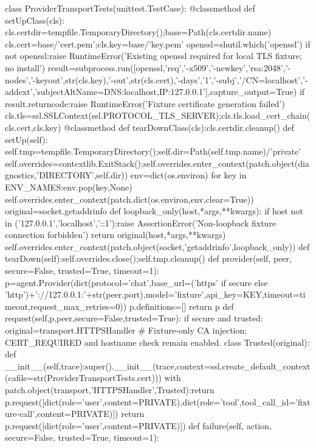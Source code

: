{{class ProviderTransportTests(unittest.TestCase):
    @classmethod
    def setUpClass(cls):
        cls.certdir=tempfile.TemporaryDirectory();base=Path(cls.certdir.name)
        cls.cert=base/'cert.pem';cls.key=base/'key.pem'
        openssl=shutil.which('openssl')
        if not openssl:raise RuntimeError('Existing openssl required for local TLS fixture; no install')
        result=subprocess.run([openssl,'req','-x509','-newkey','rsa:2048','-nodes','-keyout',str(cls.key),'-out',str(cls.cert),'-days','1','-subj','/CN=localhost','-addext','subjectAltName=DNS:localhost,IP:127.0.0.1'],capture_output=True)
        if result.returncode:raise RuntimeError('Fixture certificate generation failed')
        cls.tls=ssl.SSLContext(ssl.PROTOCOL_TLS_SERVER);cls.tls.load_cert_chain(cls.cert,cls.key)
    @classmethod
    def tearDownClass(cls):cls.certdir.cleanup()
    def setUp(self):
        self.tmp=tempfile.TemporaryDirectory();self.dir=Path(self.tmp.name)/'private'
        self.overrides=contextlib.ExitStack();self.overrides.enter_context(patch.object(diagnostics,'DIRECTORY',self.dir))
        env=dict(os.environ)
        for key in ENV_NAMES:env.pop(key,None)
        self.overrides.enter_context(patch.dict(os.environ,env,clear=True))
        original=socket.getaddrinfo
        def loopback_only(host,*args,**kwargs):
            if host not in ('127.0.0.1','localhost','::1'):raise AssertionError('Non-loopback fixture connection forbidden')
            return original(host,*args,**kwargs)
        self.overrides.enter_context(patch.object(socket,'getaddrinfo',loopback_only))
    def tearDown(self):self.overrides.close();self.tmp.cleanup()
    def provider(self, peer, secure=False, trusted=True, timeout=1):
        p=agent.Provider(dict(protocol='chat',base_url=('https' if secure else 'http')+'://127.0.0.1:'+str(peer.port),model='fixture',api_key=KEY,timeout=timeout,request_max_retries=0))
        p.definitions=[]
        return p
    def request(self,p,peer,secure=False,trusted=True):
        if secure and trusted:
            original=transport.HTTPSHandler
            # Fixture-only CA injection; CERT_REQUIRED and hostname check remain enabled.
            class Trusted(original):
                def __init__(self,trace):super().__init__(trace,context=ssl.create_default_context(cafile=str(ProviderTransportTests.cert)))
            with patch.object(transport,'HTTPSHandler',Trusted):return p.request([dict(role='user',content=PRIVATE),dict(role='tool',tool_call_id='fixture-call',content=PRIVATE)])
        return p.request([dict(role='user',content=PRIVATE)])
    def failure(self, action, secure=False, trusted=True, timeout=1):
}}
